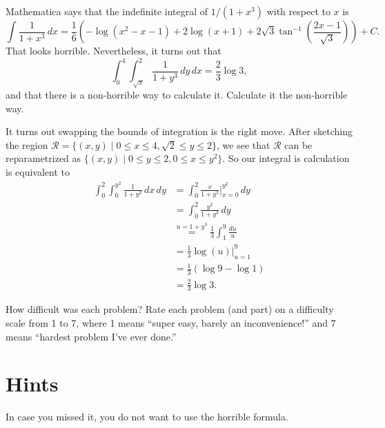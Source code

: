 \begin{problem}
  Mathematica says that the indefinite integral of $1/(1+x^3)$ with respect to $x$ is
  \[\int\frac1{1+x^3}\,dx=\frac16\left(-\log(x^2-x-1)+2\log(x+1)+2\sqrt3\tan^{-1}\left(\frac{2x-1}{\sqrt3}\right)\right)+C.\]
  That looks horrible. Nevertheless, it turns out that
  \[\int_0^4\int_{\sqrt x}^2\frac 1{1+y^3}\,dy\,dx=\frac23\log3,\]
  and that there is a non-horrible way to calculate it. Calculate it the non-horrible way.
\end{problem}
\begin{solution}
  It turns out swapping the bounds of integration is the right move. After sketching the region $\mathcal R=\{(x,y)\mid 0\leq x\leq 4,\sqrt2\leq y\leq 2\}$, we see that $\mathcal R$ can be reparametrized as $\{(x,y)\mid 0\leq y\leq 2,0\leq x\leq y^2\}$. So our integral is calculation is equivalent to
  \[\begin{split}
    \int_0^2\int_0^{y^2}\frac{1}{1+y^3}\,dx\,dy &= \int_0^2\frac{x}{1+y^3}\Big|_{x=0}^{y^2}\,dy\\
    &= \int_0^2 \frac{y^2}{1+y^3}\,dy\\
    &\overset{u=1+y^3}{=} \frac13\int_{1}^{9}\frac{du}u\\
    &= \frac13\log(u)\Big|_{u=1}^9\\
    &= \frac 13(\log 9-\log 1)\\
    &= \frac 23\log 3.
  \end{split}\]
\end{solution}

\begin{problem}
  How difficult was each problem? Rate each problem (and part) on a difficulty scale from 1 to 7, where 1 means ``super easy, barely an inconvenience!'' and 7 means ``hardest problem I've ever done.''
\end{problem}

\newpage

\section{Hints}
\begin{hint}
  In case you missed it, you do not want to use the horrible formula.
\end{hint}
